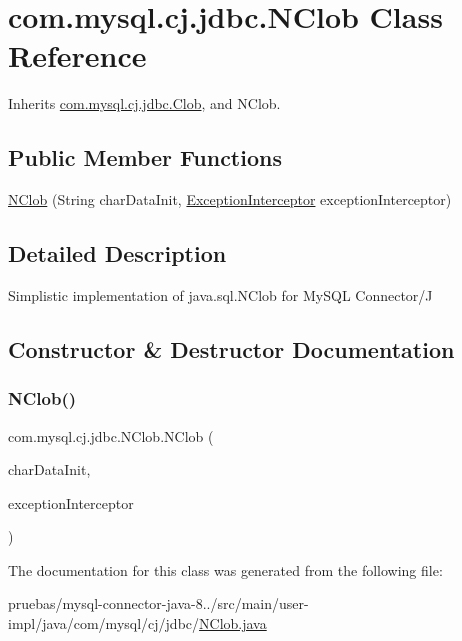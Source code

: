 \hypertarget{classcom_1_1mysql_1_1cj_1_1jdbc_1_1_n_clob}{}\section{com.\+mysql.\+cj.\+jdbc.\+N\+Clob Class Reference}
\label{classcom_1_1mysql_1_1cj_1_1jdbc_1_1_n_clob}


Inherits \mbox{\hyperlink{classcom_1_1mysql_1_1cj_1_1jdbc_1_1_clob}{com.\+mysql.\+cj.\+jdbc.\+Clob}}, and N\+Clob.

\subsection*{Public Member Functions}
\begin{DoxyCompactItemize}
\item 
\mbox{\hyperlink{classcom_1_1mysql_1_1cj_1_1jdbc_1_1_n_clob_ac77bcda688f15621d88c0cb5dbb2ac47}{N\+Clob}} (String char\+Data\+Init, \mbox{\hyperlink{interfacecom_1_1mysql_1_1cj_1_1exceptions_1_1_exception_interceptor}{Exception\+Interceptor}} exception\+Interceptor)
\end{DoxyCompactItemize}


\subsection{Detailed Description}
Simplistic implementation of java.\+sql.\+N\+Clob for My\+S\+QL Connector/J 

\subsection{Constructor \& Destructor Documentation}
\mbox{\label{classcom_1_1mysql_1_1cj_1_1jdbc_1_1_n_clob_ac77bcda688f15621d88c0cb5dbb2ac47}} 
\subsubsection{\texorpdfstring{N\+Clob()}{NClob()}}
{\footnotesize\ttfamily com.\+mysql.\+cj.\+jdbc.\+N\+Clob.\+N\+Clob (\begin{DoxyParamCaption}\item[{String}]{char\+Data\+Init,  }\item[{\mbox{\hyperlink{interfacecom_1_1mysql_1_1cj_1_1exceptions_1_1_exception_interceptor}{Exception\+Interceptor}}}]{exception\+Interceptor }\end{DoxyParamCaption})}



The documentation for this class was generated from the following file\+:\begin{DoxyCompactItemize}
\item 
pruebas/mysql-\/connector-\/java-\/8../src/main/user-\/impl/java/com/mysql/cj/jdbc/\mbox{\hyperlink{_n_clob_8java}{N\+Clob.\+java}}\end{DoxyCompactItemize}
